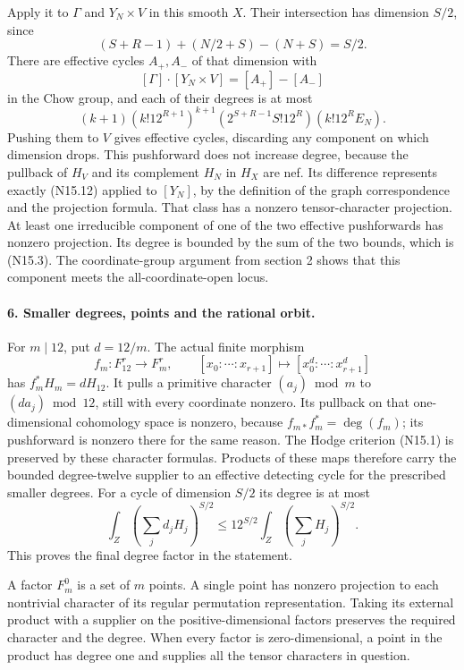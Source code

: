 Apply it to $\Gamma$ and $Y_N\times V$ in this smooth $X$.
Their intersection has dimension $S/2$, since
\[
 (S+R-1)+(N/2+S)-(N+S)=S/2.
\]
There are effective cycles $A_+,A_-$ of that dimension with
\[
 [\Gamma]\cdot[Y_N\times V]=[A_+]-[A_-]
\]
in the Chow group, and each of their degrees is at most
\[
 (k+1)(k!12^{R+1})^{k+1}
       (2^{S+R-1}S!12^R)(k!12^RE_N).
\]
Pushing them to $V$ gives effective cycles, discarding any
component on which dimension drops.  This pushforward does
not increase degree, because the pullback of $H_V$ and its
complement $H_N$ in $H_X$ are nef.  Its difference represents
exactly (N15.12) applied to $[Y_N]$, by the definition of
the graph correspondence and the projection formula.
That class has a nonzero tensor-character projection.
At least one irreducible component of one of the two effective
pushforwards has nonzero projection.  Its degree is bounded
by the sum of the two bounds, which is (N15.3).
The coordinate-group argument from section 2 shows that this
component meets the all-coordinate-open locus.

\paragraph{6. Smaller degrees, points and the rational orbit.}
For $m\mid12$, put $d=12/m$.  The actual finite morphism
\[
 f_m:F_{12}^r\longrightarrow F_m^r,
                 \qquad[x_0:\cdots:x_{r+1}]
                        \longmapsto[x_0^d:\cdots:x_{r+1}^d]
                                                        \tag{N15.16}
\]
has $f_m^*H_m=dH_{12}$.  It pulls a primitive character
$(a_j)\bmod m$ to $(da_j)\bmod12$, still with every
coordinate nonzero.  Its pullback on that one-dimensional
cohomology space is nonzero, because
$f_{m*}f_m^*=\deg(f_m)$; its pushforward is nonzero there
for the same reason.  The Hodge criterion (N15.1) is
preserved by these character formulas.  Products of these
maps therefore carry the bounded degree-twelve supplier
to an effective detecting cycle for the prescribed smaller
degrees.  For a cycle of dimension $S/2$ its degree is at most
\[
 \int_Z\left(\sum_jd_jH_j\right)^{S/2}
 \leq12^{S/2}\int_Z\left(\sum_jH_j\right)^{S/2}.
\]
This proves the final degree factor in the statement.

A factor $F_m^0$ is a set of $m$ points.  A single point
has nonzero projection to each nontrivial character of its
regular permutation representation.  Taking its external
product with a supplier on the positive-dimensional factors
preserves the required character and the degree.  When every
factor is zero-dimensional, a point in the product has
degree one and supplies all the tensor characters in question.

